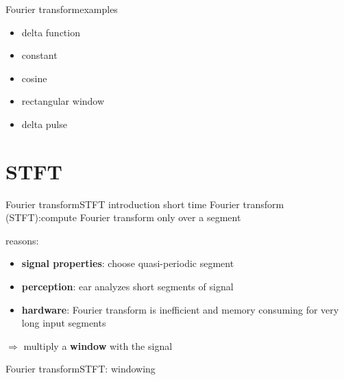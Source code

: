 	\begin{frame}{Fourier transform}{examples}
			\begin{itemize}
				\item	delta function
				\item	constant
				\item	cosine
				\item	rectangular window
				\item	delta pulse
			\end{itemize}
	\end{frame}	


\section{STFT}
	\begin{frame}{Fourier transform}{STFT introduction}
		short time Fourier transform (STFT):\linebreak compute Fourier transform only over a segment

		\vspace{3mm}		
		\pause
		reasons:
		\begin{itemize}
			\item	\textbf{signal properties}: choose quasi-periodic segment
			\item	\textbf{perception}: ear analyzes short segments of signal
			\item	\textbf{hardware}: Fourier transform is inefficient and memory consuming for very long input segments
		\end{itemize}
		\pause
        \bigskip
		$\Rightarrow$ multiply a \textbf{window} with the signal
	\end{frame}	

	\begin{frame}{Fourier transform}{STFT: windowing}
	\end{frame}	
    
